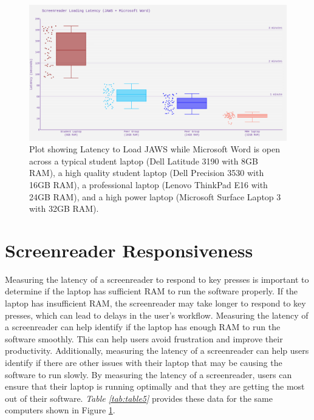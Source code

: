 \begin{figure}[H]
\centering
\includegraphics[width=\textwidth]{images/ComputerRBDisplaySpecsTVIFig1.png}

\caption[Latency to Load JAWS]{Plot showing Latency to Load JAWS while Microsoft Word is open across a typical student laptop (Dell Latitude 3190 with 8GB RAM), a high quality student laptop (Dell Precision 3530 with 16GB RAM), a professional laptop (Lenovo ThinkPad E16 with 24GB RAM), and a high power laptop (Microsoft Surface Laptop 3 with 32GB RAM).}\label{fig:figure 1}
\end{figure}

\pagebreak
\hypertarget{screenreader-response}{}\section{Screenreader Responsiveness}\label{screenreader-response}
Measuring the latency of a screenreader to respond to key presses is important to determine if the laptop has sufficient RAM to run the software properly. If the laptop has insufficient RAM, the screenreader may take longer to respond to key presses, which can lead to delays in the user’s workflow. Measuring the latency of a screenreader can help identify if the laptop has enough RAM to run the software smoothly. This can help users avoid frustration and improve their productivity. Additionally, measuring the latency of a screenreader can help users identify if there are other issues with their laptop that may be causing the software to run slowly. By measuring the latency of a screenreader, users can ensure that their laptop is running optimally and that they are getting the most out of their software. \textit{Table \ref{tab:table5}} provides these data for the same computers shown in Figure \ref{fig:figure 1}.

